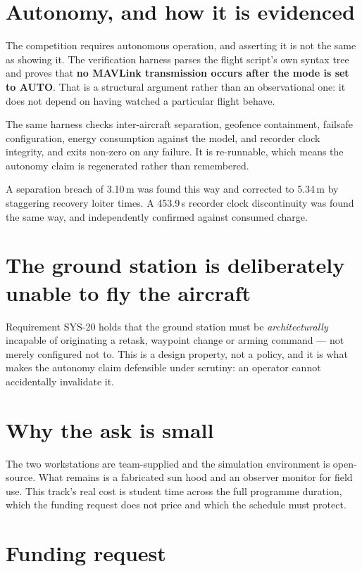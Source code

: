 \documentclass[11pt,a4paper]{article}
\begin{document}
\section{Autonomy, and how it is evidenced}

The competition requires autonomous operation, and asserting it is not the same
as showing it. The verification harness parses the flight script's own syntax
tree and proves that \textbf{no MAVLink transmission occurs after the mode is
set to AUTO}. That is a structural argument rather than an observational one:
it does not depend on having watched a particular flight behave.

The same harness checks inter-aircraft separation, geofence containment,
failsafe configuration, energy consumption against the model, and recorder clock
integrity, and exits non-zero on any failure. It is re-runnable, which means the
autonomy claim is regenerated rather than remembered.

A separation breach of 3.10\,m was found this way and corrected to 5.34\,m by
staggering recovery loiter times. A 453.9\,s recorder clock discontinuity was
found the same way, and independently confirmed against consumed charge.

\section{The ground station is deliberately unable to fly the aircraft}

Requirement SYS-20 holds that the ground station must be \emph{architecturally}
incapable of originating a retask, waypoint change or arming command --- not
merely configured not to. This is a design property, not a policy, and it is
what makes the autonomy claim defensible under scrutiny: an operator cannot
accidentally invalidate it.

\section{Why the ask is small}

The two workstations are team-supplied and the simulation environment is
open-source. What remains is a fabricated sun hood and an observer monitor for
field use. This track's real cost is student time across the full programme
duration, which the funding request does not price and which the schedule must
protect.

\section{Funding request}
\end{document}
